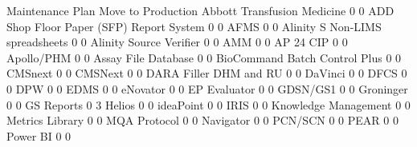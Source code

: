 \documentclass{article}
\begin{document}
\begin{Schunk}
\begin{Soutput}
                                           Maintenance Plan Move to Production
  Abbott Transfusion Medicine                             0                  0
  ADD Shop Floor Paper (SFP) Report System                0                  0
  AFMS                                                    0                  0
  Alinity S Non-LIMS spreadsheets                         0                  0
  Alinity Source Verifier                                 0                  0
  AMM                                                     0                  0
  AP 24 CIP                                               0                  0
  Apollo/PHM                                              0                  0
  Assay File Database                                     0                  0
  BioCommand Batch Control Plus                           0                  0
  CMSnext                                                 0                  0
  CMSNext                                                 0                  0
  DARA Filler DHM and RU                                  0                  0
  DaVinci                                                 0                  0
  DFCS                                                    0                  0
  DPW                                                     0                  0
  EDMS                                                    0                  0
  eNovator                                                0                  0
  EP Evaluator                                            0                  0
  GDSN/GS1                                                0                  0
  Groninger                                               0                  0
  GS Reports                                              0                  3
  Helios                                                  0                  0
  ideaPoint                                               0                  0
  IRIS                                                    0                  0
  Knowledge Management                                    0                  0
  Metrics Library                                         0                  0
  MQA Protocol                                            0                  0
  Navigator                                               0                  0
  PCN/SCN                                                 0                  0
  PEAR                                                    0                  0
  Power BI                                                0                  0

\end{Soutput}
\end{Schunk}
\end{document}
